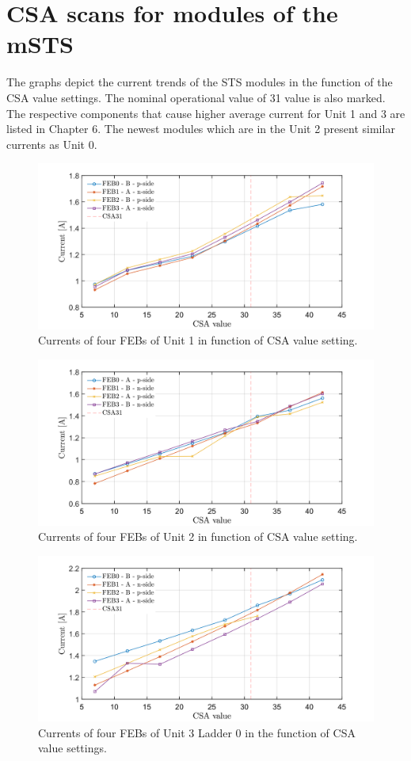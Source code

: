 \chapter{CSA scans for modules of the mSTS}
\label{CSA}
The graphs depict the current trends of the \gls{STS} modules in the function of the CSA value settings. The nominal operational value of 31 value is also marked. The respective components that cause higher average current for Unit 1 and 3 are listed in Chapter 6. The newest modules which are in the Unit 2 present similar currents as Unit 0. 
\vfill
\begin{figure}[h!]
\centering
\includegraphics[width=0.9\columnwidth]{Chapter6/DCS/images/U1CSABIAS.png}
\caption{Currents of four \glspl{FEB} of Unit 1 in function of CSA value setting.}
\label{U1CSABIAS}
\end{figure}
\vfill
\begin{figure}
\centering
\includegraphics[width=0.9\columnwidth]{Chapter6/DCS/images/U2CSABIAS.png}
\caption{Currents of four \glspl{FEB} of Unit 2 in function of CSA value setting.}
\label{U2CSABIAS}
\end{figure}

\begin{figure}[h!]
\centering
\includegraphics[width=0.9\columnwidth]{Chapter6/DCS/images/U3L1CSABIAS.png}
\caption{Currents of four \glspl{FEB} of Unit 3 Ladder 0 in the function of CSA value settings.}
\label{U3L1CSABIAS}
\end{figure}

